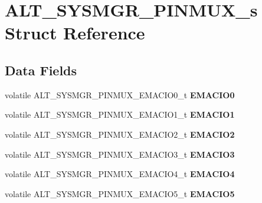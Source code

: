 \hypertarget{structALT__SYSMGR__PINMUX__s}{}\section{A\+L\+T\+\_\+\+S\+Y\+S\+M\+G\+R\+\_\+\+P\+I\+N\+M\+U\+X\+\_\+s Struct Reference}
\label{structALT__SYSMGR__PINMUX__s}
\subsection*{Data Fields}
\begin{DoxyCompactItemize}
\item 
\mbox{\label{structALT__SYSMGR__PINMUX__s_a866bb9484e2043793befecab5e5d117f}} 
volatile A\+L\+T\+\_\+\+S\+Y\+S\+M\+G\+R\+\_\+\+P\+I\+N\+M\+U\+X\+\_\+\+E\+M\+A\+C\+I\+O0\+\_\+t {\bfseries E\+M\+A\+C\+I\+O0}
\item 
\mbox{\label{structALT__SYSMGR__PINMUX__s_a75ecfdcd47b1c8b965522830e352fad1}} 
volatile A\+L\+T\+\_\+\+S\+Y\+S\+M\+G\+R\+\_\+\+P\+I\+N\+M\+U\+X\+\_\+\+E\+M\+A\+C\+I\+O1\+\_\+t {\bfseries E\+M\+A\+C\+I\+O1}
\item 
\mbox{\label{structALT__SYSMGR__PINMUX__s_a192c86c845f98d33e64b26c34db484a5}} 
volatile A\+L\+T\+\_\+\+S\+Y\+S\+M\+G\+R\+\_\+\+P\+I\+N\+M\+U\+X\+\_\+\+E\+M\+A\+C\+I\+O2\+\_\+t {\bfseries E\+M\+A\+C\+I\+O2}
\item 
\mbox{\label{structALT__SYSMGR__PINMUX__s_abeaaf3310891abe5cfeb637995c48851}} 
volatile A\+L\+T\+\_\+\+S\+Y\+S\+M\+G\+R\+\_\+\+P\+I\+N\+M\+U\+X\+\_\+\+E\+M\+A\+C\+I\+O3\+\_\+t {\bfseries E\+M\+A\+C\+I\+O3}
\item 
\mbox{\label{structALT__SYSMGR__PINMUX__s_a872c15b95efd76e960cb33600f4eccbd}} 
volatile A\+L\+T\+\_\+\+S\+Y\+S\+M\+G\+R\+\_\+\+P\+I\+N\+M\+U\+X\+\_\+\+E\+M\+A\+C\+I\+O4\+\_\+t {\bfseries E\+M\+A\+C\+I\+O4}
\item 
\mbox{\label{structALT__SYSMGR__PINMUX__s_a035782ca387753354bd217ce5f754294}} 
volatile A\+L\+T\+\_\+\+S\+Y\+S\+M\+G\+R\+\_\+\+P\+I\+N\+M\+U\+X\+\_\+\+E\+M\+A\+C\+I\+O5\+\_\+t {\bfseries E\+M\+A\+C\+I\+O5}

\end{DoxyCompactItemize}
